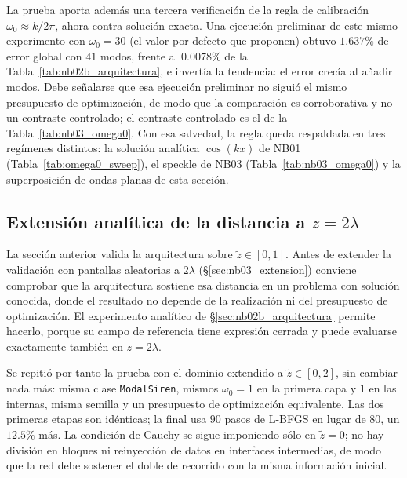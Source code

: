 La prueba aporta además una tercera verificación de la regla de calibración
$\omega_0\approx k/2\pi$, ahora contra solución exacta. Una ejecución preliminar
de este mismo experimento con $\omega_0=30$ (el valor por defecto que
\textcite{sitzmann2020siren} proponen) obtuvo $1.637\%$ de error global con
$41$ modos, frente al $0.0078\%$ de la Tabla~\ref{tab:nb02b_arquitectura}, e
invertía la tendencia: el error crecía al añadir modos. Debe señalarse que esa
ejecución preliminar no siguió el mismo presupuesto de optimización, de modo
que la comparación es corroborativa y no un contraste controlado; el contraste
controlado es el de la Tabla~\ref{tab:nb03_omega0}. Con esa salvedad, la regla
queda respaldada en tres regímenes distintos: la solución analítica $\cos(kx)$
de NB01 (Tabla~\ref{tab:omega0_sweep}), el speckle de NB03
(Tabla~\ref{tab:nb03_omega0}) y la superposición de ondas planas de esta
sección.

\subsection{Extensión analítica de la distancia a
\texorpdfstring{$z=2\lambda$}{z=2 lambda}}
\label{sec:nb02b_extension}

La sección anterior valida la arquitectura sobre $\tilde z\in[0,1]$. Antes de
extender la validación con pantallas aleatorias a $2\lambda$
(§\ref{sec:nb03_extension}) conviene comprobar que la arquitectura sostiene esa
distancia en un problema con solución conocida, donde el resultado no depende
de la realización ni del presupuesto de optimización. El experimento analítico
de §\ref{sec:nb02b_arquitectura} permite hacerlo, porque su campo de referencia
tiene expresión cerrada y puede evaluarse exactamente también en
$z=2\lambda$.

Se repitió por tanto la prueba con el dominio extendido a
$\tilde z\in[0,2]$, sin cambiar nada más: misma clase \texttt{ModalSiren},
mismos $\omega_0=1$ en la primera capa y $1$ en las internas, misma semilla y
un presupuesto de optimización equivalente. Las dos primeras etapas son idénticas; la final usa $90$ pasos de L-BFGS en lugar de $80$, un $12.5\%$ más. La condición de Cauchy se sigue imponiendo
sólo en $\tilde z=0$; no hay división en bloques ni reinyección de datos en
interfaces intermedias, de modo que la red debe sostener el doble de recorrido
con la misma información inicial.

